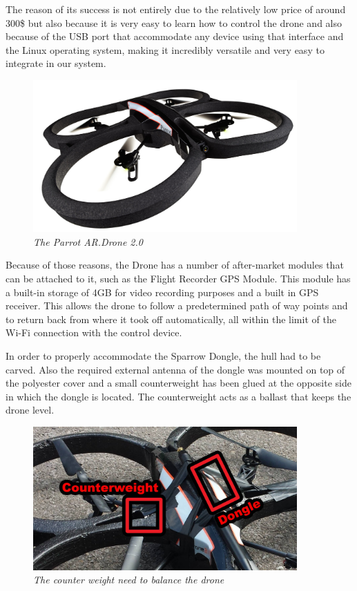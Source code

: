 The reason of its success is not entirely due to the relatively low price of around 300\$ but also because it is very easy to learn how to control the drone and also because of the USB port that accommodate any device using that interface and the Linux operating system, making it incredibly versatile and very easy to integrate in our system.


\begin{figure}[ht]
\begin{center}
\includegraphics[width=0.9\textwidth]{img/drone.jpg}
\end{center}
\caption{\small \itshape{The Parrot AR.Drone 2.0}\cite{parrot_drone}}
\end{figure}


Because of those reasons, the Drone has a number of after-market modules that can be attached to it, such as 
the Flight Recorder GPS Module. This module has a built-in storage of 4GB for video recording purposes and a built in GPS receiver. This allows the drone to follow a predetermined path of way points and to return back from where it took off automatically, all within the limit of the Wi-Fi connection with the control device.

In order to properly accommodate the Sparrow Dongle, the hull had to be carved. Also the required external antenna of the dongle was mounted on top of the polyester cover and a small counterweight  has been glued at the opposite side in which the dongle is located. The counterweight acts as a ballast that keeps the drone level.


\begin{figure}[ht]
\begin{center}
\includegraphics[width=0.9\textwidth]{img/counterweight.png}
\end{center}
\caption{\small \itshape{The counter weight need to balance the drone}}
\end{figure}

